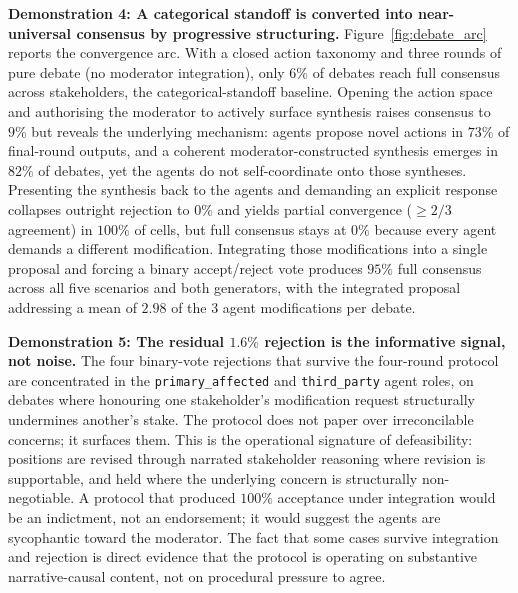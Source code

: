 \documentclass{article}
\theoremstyle{plain}
\theoremstyle{definition}
\theoremstyle{remark}
\begin{document}
\textbf{Demonstration 4: A categorical standoff is converted into near-universal consensus by progressive structuring.} Figure~\ref{fig:debate_arc} reports the convergence arc. With a closed action taxonomy and three rounds of pure debate (no moderator integration), only $6\%$ of debates reach full consensus across stakeholders, the categorical-standoff baseline. Opening the action space and authorising the moderator to actively surface synthesis raises consensus to $9\%$ but reveals the underlying mechanism: agents propose novel actions in $73\%$ of final-round outputs, and a coherent moderator-constructed synthesis emerges in $82\%$ of debates, yet the agents do not self-coordinate onto those syntheses. Presenting the synthesis back to the agents and demanding an explicit response collapses outright rejection to $0\%$ and yields partial convergence ($\geq 2/3$ agreement) in $100\%$ of cells, but full consensus stays at $0\%$ because every agent demands a different modification. Integrating those modifications into a single proposal and forcing a binary accept/reject vote produces $95\%$ full consensus across all five scenarios and both generators, with the integrated proposal addressing a mean of $2.98$ of the $3$ agent modifications per debate.

\textbf{Demonstration 5: The residual $1.6\%$ rejection is the informative signal, not noise.} The four binary-vote rejections that survive the four-round protocol are concentrated in the \texttt{primary\_affected} and \texttt{third\_party} agent roles, on debates where honouring one stakeholder's modification request structurally undermines another's stake. The protocol does not paper over irreconcilable concerns; it surfaces them. This is the operational signature of defeasibility: positions are revised through narrated stakeholder reasoning where revision is supportable, and held where the underlying concern is structurally non-negotiable. A protocol that produced $100\%$ acceptance under integration would be an indictment, not an endorsement; it would suggest the agents are sycophantic toward the moderator. The fact that some cases survive integration and rejection is direct evidence that the protocol is operating on substantive narrative-causal content, not on procedural pressure to agree.
\end{document}
